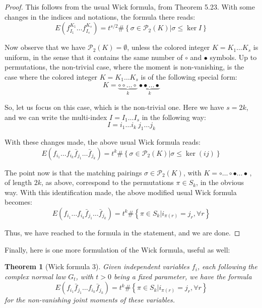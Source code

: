 \documentclass[12pt]{amsbook}
\newtheorem{theorem}{Theorem}[chapter]
\begin{document}
\begin{proof}
This follows from the usual Wick formula, from Theorem 5.23. With some changes in the indices and notations, the formula there reads:
$$E\left(f_{I_1}^{K_1}\ldots f_{I_s}^{K_s}\right)=t^{s/2}\#\left\{\sigma\in\mathcal P_2(K)\Big|\sigma\leq\ker I\right\}$$

Now observe that we have $\mathcal P_2(K)=\emptyset$, unless the colored integer $K=K_1\ldots K_s$ is uniform, in the sense that it contains the same number of $\circ$ and $\bullet$ symbols. Up to permutations, the non-trivial case, where the moment is non-vanishing, is the case where the colored integer $K=K_1\ldots K_s$ is of the following special form:
$$K=\underbrace{\circ\circ\ldots\circ}_k\ \underbrace{\bullet\bullet\ldots\bullet}_k$$

So, let us focus on this case, which is the non-trivial one. Here we have $s=2k$, and we can write the multi-index $I=I_1\ldots I_s$ in the following way:
$$I=i_1\ldots i_k\ j_1\ldots j_k$$

With these changes made, the above usual Wick formula reads:
$$E\left(f_{i_1}\ldots f_{i_k}\bar{f}_{j_1}\ldots\bar{f}_{j_k}\right)=t^k\#\left\{\sigma\in\mathcal P_2(K)\Big|\sigma\leq\ker(ij)\right\}$$

The point now is that the matching pairings $\sigma\in\mathcal P_2(K)$, with $K=\circ\ldots\circ\bullet\ldots\bullet\,$, of length $2k$, as above, correspond to the permutations $\pi\in S_k$, in the obvious way. With this identification made, the above modified usual Wick formula becomes:
$$E\left(f_{i_1}\ldots f_{i_k}\bar{f}_{j_1}\ldots\bar{f}_{j_k}\right)=t^k\#\left\{\pi\in S_k\Big|i_{\pi(r)}=j_r,\forall r\right\}$$

Thus, we have reached to the formula in the statement, and we are done.
\end{proof}

Finally, here is one more formulation of the Wick formula, useful as well:


\begin{theorem}[Wick formula 3]
Given independent variables $f_i$, each following the complex normal law $G_t$, with $t>0$ being a fixed parameter, we have the formula
$$E\left(f_{i_1}\bar{f}_{j_1}\ldots f_{i_k}\bar{f}_{j_k}\right)=t^k\#\left\{\pi\in S_k\Big|i_{\pi(r)}=j_r,\forall r\right\}$$
for the non-vanishing joint moments of these variables.
\end{theorem}
\end{document}
